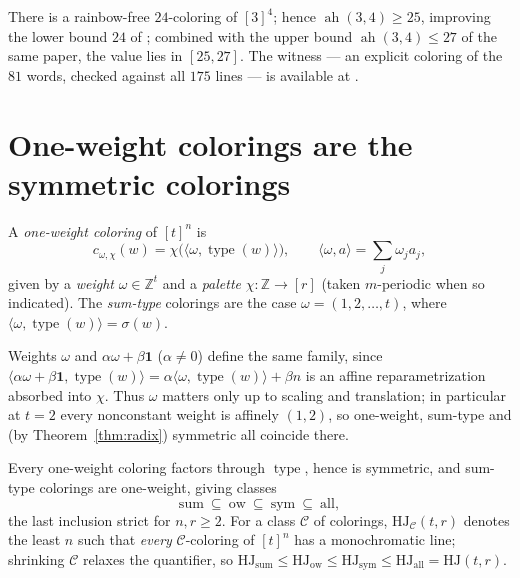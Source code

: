 \documentclass[12pt]{article}
\newcommand{\HJ}{\mathrm{HJ}}
\newcommand{\Z}{\mathbb{Z}}
\DeclareMathOperator{\type}{type}
\DeclareMathOperator{\ah}{ah}
\begin{document}
\begin{proposition}\label{prop:ah34}
There is a rainbow-free $24$-coloring of $[3]^{4}$; hence
$\ah(3,4)\ge 25$, improving the lower bound $24$ of
\cite{zheng2024rainbow}; combined with the upper bound
$\ah(3,4)\le 27$ of the same paper, the value lies in $[25,27]$. The witness --- an
explicit coloring of the $81$ words, checked against all $175$ lines
--- is available at \cite{hjcerts}.
\end{proposition}

\section{One-weight colorings are the symmetric colorings}\label{sec:ow}

\begin{definition}\label{def:ow}
A \emph{one-weight coloring} of $[t]^{n}$ is
\[
c_{\omega,\chi}(w)=\chi\bigl(\langle\omega,\type(w)\rangle\bigr),
\qquad
\langle\omega,a\rangle=\textstyle\sum_{j}\omega_{j}a_{j},
\]
given by a \emph{weight} $\omega\in\Z^{t}$ and a \emph{palette}
$\chi\colon\Z\to[r]$ (taken $m$-periodic when so indicated). The
\emph{sum-type} colorings are the case $\omega=(1,2,\dots,t)$, where
$\langle\omega,\type(w)\rangle=\sigma(w)$.
\end{definition}

\begin{remark}\label{rem:affine}
Weights $\omega$ and $\alpha\omega+\beta\mathbf{1}$ ($\alpha\ne 0$)
define the same family, since
$\langle\alpha\omega+\beta\mathbf{1},\type(w)\rangle
=\alpha\langle\omega,\type(w)\rangle+\beta n$ is an affine
reparametrization absorbed into $\chi$. Thus $\omega$ matters only up
to scaling and translation; in particular at $t=2$ every nonconstant
weight is affinely $(1,2)$, so one-weight, sum-type and (by
Theorem~\ref{thm:radix}) symmetric all coincide there.
\end{remark}

Every one-weight coloring factors through $\type$, hence is symmetric,
and sum-type colorings are one-weight, giving classes
\[
\mathrm{sum}\ \subseteq\ \mathrm{ow}\ \subseteq\ \mathrm{sym}
\ \subseteq\ \mathrm{all},
\]
the last inclusion strict for $n,r\ge 2$. For a class $\mathcal{C}$ of
colorings, $\HJ_{\mathcal{C}}(t,r)$ denotes the least $n$ such that
\emph{every} $\mathcal{C}$-coloring of $[t]^{n}$ has a monochromatic
line; shrinking $\mathcal{C}$ relaxes the quantifier, so
$\HJ_{\mathrm{sum}}\le\HJ_{\mathrm{ow}}\le\HJ_{\mathrm{sym}}
\le\HJ_{\mathrm{all}}=\HJ(t,r)$.
\end{document}
